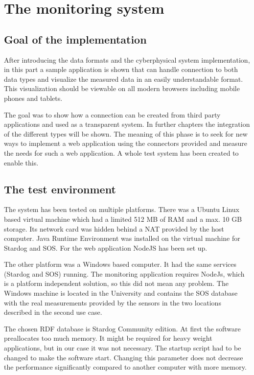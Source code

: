 \chapter{The monitoring system}
\section{Goal of the implementation}

After introducing the data formats and the cyberphysical system implementation, in this part a sample application is shown that can handle connection to both data types and visualize the measured data in an easily understandable format. This visualization should be viewable on all modern browsers including mobile phones and tablets.

The goal was to show how a connection can be created from third party applications and used as a transparent system. In further chapters the integration of the different types will be shown. The meaning of this phase is to seek for new ways to implement a web application using the connectors provided and measure the needs for such a web application. A whole test system has been created to enable this.

\section{The test environment}

The system has been tested on multiple platforms. There was a Ubuntu Linux based virtual machine which had a limited 512 MB of RAM and a max. 10 GB storage. Its network card was hidden behind a NAT provided by the host computer. Java Runtime Environment was installed on the virtual machine for Stardog and SOS. For the web application NodeJS has been set up. 

The other platform was a Windows based computer. It had the same services (Stardog and SOS) running. The monitoring application requires NodeJs, which is a platform independent solution, so this did not mean any problem. The Windows machine is located in the University and contains the SOS database with the real measurements provided by the sensors in the two locations described in the second use case. 

The chosen RDF database is Stardog Community edition. At first the software preallocates too much memory. It might be required for heavy weight applications, but in our case it was not necessary. The startup script had to be changed to make the software start. Changing this parameter does not decrease the performance significantly compared to another computer with more memory. 

